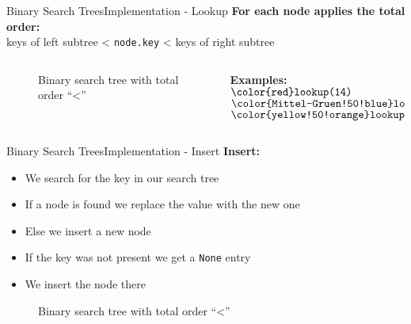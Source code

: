 \begin{frame}{Binary Search Trees}{Implementation - Lookup}
  \textbf{For each node applies the total order:}\\
  \hspace{1.5em}keys of left subtree
  < \texttt{\color{Mittel-Blau}node.key} < keys of right
  subtree
  \begin{columns}
    \begin{column}{0.8\linewidth}
      \begin{figure}
        \begin{adjustbox}{width=\linewidth}
          
        \end{adjustbox}
        \caption{Binary search tree with total order
          \enquote{\color{Mittel-Blau}<}}
        \label{fig:binary_search_trees:binary_tree_lookup}
      \end{figure}
    \end{column}
    \begin{column}{0.2\linewidth}
      \textbf{Examples:}\\[1em]
      $\rlap\text\texttt{\color{red}lookup(14)}$\\[0.5em]
      $\rlap\text\texttt{\color{Mittel-Gruen!50!blue}lookup(6)}$
        \\[0.5em]
      $\rlap\text\texttt{\color{yellow!50!orange}lookup(19)}$
    \end{column}
  \end{columns}
\end{frame}


\begin{frame}{Binary Search Trees}{Implementation - Insert}
  \textbf{Insert:}
  \begin{itemize}
    \item<2->
      We search for the key in our search tree
    \item<3->
      If a node is found we replace the value with the new one
    \item<4->
      Else we insert a new node
    \item<5->If the key was not present we get a \texttt{\color{Mittel-Blau}None} entry
    \item<6->We insert the node there
  \end{itemize}
  \vspace{-1em}
  \begin{figure}
    
    \caption{Binary search tree with total order
      \enquote{\color{Mittel-Blau}<}}
    \label{fig:binary_search_trees:binary_tree_insert}
  \end{figure}
\end{frame}

